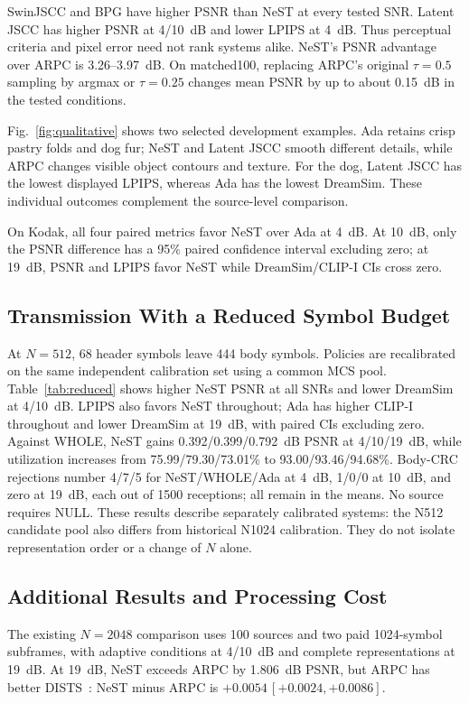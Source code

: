 SwinJSCC and BPG have higher PSNR than NeST at every tested SNR. Latent JSCC has higher PSNR at 4/10~dB and lower LPIPS at 4~dB. Thus perceptual criteria and pixel error need not rank systems alike. NeST's PSNR advantage over ARPC is 3.26--3.97~dB. On matched100, replacing ARPC's original $\tau=0.5$ sampling by argmax or $\tau=0.25$ changes mean PSNR by up to about 0.15~dB in the tested conditions.

Fig.~\ref{fig:qualitative} shows two selected development examples. Ada retains crisp pastry folds and dog fur; NeST and Latent JSCC smooth different details, while ARPC changes visible object contours and texture. For the dog, Latent JSCC has the lowest displayed LPIPS, whereas Ada has the lowest DreamSim. These individual outcomes complement the source-level comparison.

On Kodak, all four paired metrics favor NeST over Ada at 4~dB. At 10~dB, only the PSNR difference has a 95\% paired confidence interval excluding zero; at 19~dB, PSNR and LPIPS favor NeST while DreamSim/CLIP-I CIs cross zero.

\subsection{Transmission With a Reduced Symbol Budget}

At $N=512$, 68 header symbols leave 444 body symbols. Policies are recalibrated on the same independent calibration set using a common MCS pool. Table~\ref{tab:reduced} shows higher NeST PSNR at all SNRs and lower DreamSim at 4/10~dB. LPIPS also favors NeST throughout; Ada has higher CLIP-I throughout and lower DreamSim at 19~dB, with paired CIs excluding zero. Against WHOLE, NeST gains 0.392/0.399/0.792~dB PSNR at 4/10/19~dB, while utilization increases from 75.99/79.30/73.01\% to 93.00/93.46/94.68\%. Body-CRC rejections number 4/7/5 for NeST/WHOLE/Ada at 4~dB, 1/0/0 at 10~dB, and zero at 19~dB, each out of 1500 receptions; all remain in the means. No source requires NULL. These results describe separately calibrated systems: the N512 candidate pool also differs from historical N1024 calibration. They do not isolate representation order or a change of $N$ alone.

\subsection{Additional Results and Processing Cost}
The existing $N=2048$ comparison uses 100 sources and two paid 1024-symbol subframes, with adaptive conditions at 4/10~dB and complete representations at 19~dB. At 19~dB, NeST exceeds ARPC by 1.806~dB PSNR, but ARPC has better DISTS~\cite{dists}: NeST minus ARPC is $+0.0054\,[+0.0024,+0.0086]$.

